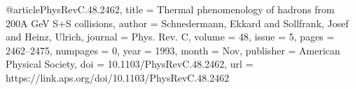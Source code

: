 @article{PhysRevC.48.2462,
  title = {Thermal phenomenology of hadrons from 200A GeV S+S collisions},
  author = {Schnedermann, Ekkard and Sollfrank, Josef and Heinz, Ulrich},
  journal = {Phys. Rev. C},
  volume = {48},
  issue = {5},
  pages = {2462--2475},
  numpages = {0},
  year = {1993},
  month = {Nov},
  publisher = {American Physical Society},
  doi = {10.1103/PhysRevC.48.2462},
  url = {https://link.aps.org/doi/10.1103/PhysRevC.48.2462}
}
